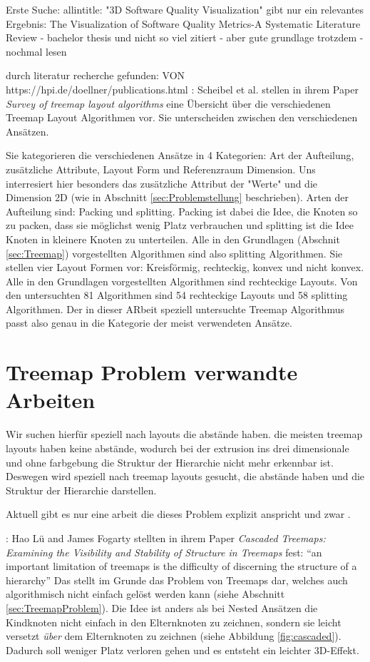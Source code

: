 Erste Suche: allintitle: "3D Software Quality Visualization"
gibt nur ein relevantes Ergebnis:
The Visualization of Software Quality Metrics-A Systematic Literature Review
- bachelor thesis und nicht so viel zitiert
- aber gute grundlage trotzdem 
- nochmal lesen


durch literatur recherche gefunden: VON https://hpi.de/doellner/publications.html :
Scheibel et al. stellen in ihrem Paper \textit{Survey of treemap layout algorithms}\cite{scheibel2020survey} eine Übersicht über die verschiedenen Treemap Layout Algorithmen vor. Sie unterscheiden zwischen den verschiedenen Ansätzen. 

Sie kategorieren die verschiedenen Ansätze in 4 Kategorien: Art der Aufteilung, zusätzliche Attribute, Layout Form und Referenzraum Dimension. 
Uns interresiert hier besonders das zusätzliche Attribut der "Werte" und die Dimension 2D (wie in Abschnitt \ref{sec:Problemstellung} beschrieben).
Arten der Aufteilung sind: Packing und splitting. Packing ist dabei die Idee, die Knoten so zu packen, dass sie möglichst wenig Platz verbrauchen und splitting ist die Idee Knoten in kleinere Knoten zu unterteilen. Alle in den Grundlagen (Abschnit \ref{sec:Treemap}) vorgestellten Algorithmen sind also splitting Algorithmen.
Sie stellen vier Layout Formen vor: Kreisförmig, rechteckig, konvex und nicht konvex. Alle in den Grundlagen vorgestellten Algorithmen sind rechteckige Layouts.
Von den untersuchten 81 Algorithmen sind 54 rechteckige Layouts und 58 splitting Algorithmen. Der in dieser ARbeit speziell untersuchte Treemap Algorithmus passt also genau in die Kategorie der meist verwendeten Ansätze.


\section{Treemap Problem verwandte Arbeiten}
Wir suchen hierfür speziell nach layouts die abstände haben. die meisten treemap layouts haben keine abstände, wodurch bei der extrusion ins drei dimensionale und ohne farbgebung die Struktur der Hierarchie nicht mehr erkennbar ist. Deswegen wird speziell nach treemap layouts gesucht, die abstände haben und die Struktur der Hierarchie darstellen.


Aktuell gibt es nur eine arbeit die dieses Problem explizit anspricht und zwar \cite{lu2008cascaded}.


\cite{lu2008cascaded}:
Hao Lü and James Fogarty stellten in ihrem Paper \textit{Cascaded Treemaps:
Examining the Visibility and Stability of Structure in Treemaps}\cite{lu2008cascaded} fest: \enquote{an important limitation of treemaps is
the difficulty of discerning the structure of a hierarchy}\cite[1]{lu2008cascaded} Das stellt im Grunde das Problem von Treemaps dar, welches auch algorithmisch nicht einfach gelöst werden kann (siehe Abschnitt \ref{sec:TreemapProblem}). Die Idee ist anders als bei Nested Ansätzen die Kindknoten nicht einfach in den Elternknoten zu zeichnen, sondern sie leicht versetzt \textit{über} dem Elternknoten zu zeichnen (siehe Abbildung \ref{fig:cascaded}). Dadurch soll weniger Platz verloren gehen und es entsteht ein leichter 3D-Effekt.

